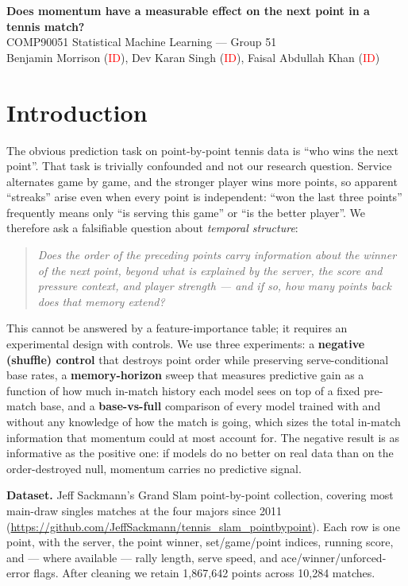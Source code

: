 \documentclass[10pt,a4paper]{article}
\newcommand{\ph}[1]{\textcolor{red}{#1}}
\begin{document}
\begin{center}
  {\large\bfseries Does momentum have a measurable effect on the next point in a tennis match?}\\[0.3ex]
  {\small COMP90051 Statistical Machine Learning --- Group 51\\
  Benjamin Morrison (\ph{ID}), Dev Karan Singh (\ph{ID}), Faisal Abdullah Khan (\ph{ID})}
\end{center}
\vspace{-0.5ex}

\section{Introduction}
The obvious prediction task on point-by-point tennis data is ``who wins the next
point''. That task is trivially confounded and not our research question. Service
alternates game by game, and the stronger player wins more points, so apparent
``streaks'' arise even when every point is independent: ``won the last three
points'' frequently means only ``is serving this game'' or ``is the better
player''. We therefore ask a falsifiable question about \emph{temporal
structure}:

\begin{quote}\itshape
Does the \emph{order} of the preceding points carry information about the winner
of the next point, \emph{beyond} what is explained by the server, the score and
pressure context, and player strength --- and if so, how many points back does
that memory extend?
\end{quote}

This cannot be answered by a feature-importance table; it requires an
experimental design with controls. We use three experiments: a \textbf{negative
(shuffle) control} that destroys point order while preserving serve-conditional
base rates, a \textbf{memory-horizon} sweep that measures predictive gain as a
function of how much in-match history each model sees on top of a fixed
pre-match base, and a \textbf{base-vs-full} comparison of every model trained
with and without any knowledge of how the match is going, which sizes the total
in-match information that momentum could at most account for. The negative
result is as informative as the positive one: if models do no better on real
data than on the order-destroyed null, momentum carries no predictive signal.

\textbf{Dataset.} Jeff Sackmann's Grand Slam point-by-point collection, covering
most main-draw singles matches at the four majors since 2011
(\url{https://github.com/JeffSackmann/tennis_slam_pointbypoint}). Each row is one
point, with the server, the point winner, set/game/point indices, running score,
and --- where available --- rally length, serve speed, and ace/winner/unforced-error
flags. After cleaning we retain 1{,}867{,}642 points across 10{,}284 matches.
\end{document}

